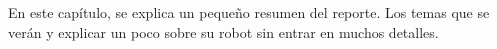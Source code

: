 En este capítulo, se explica un pequeño resumen del reporte. Los temas que se verán y explicar un poco sobre su robot sin entrar en muchos detalles.
